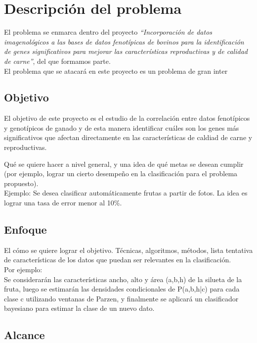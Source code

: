 \documentclass[12pt,a4paper,titlepage]{report}
\begin{document}
\chapter{Descripción del problema}

El problema se enmarca dentro del proyecto \emph{``Incorporación de datos imagenológicos a las bases de datos fenotípicas de bovinos para la identificación de genes significativos para mejorar las características reproductivas y de calidad de carne''}, del que formamos parte.\\

El problema que se atacará en este proyecto es un problema de gran inter

\section*{Objetivo}

El objetivo de este proyecto es el estudio de la correlación entre datos fenotípicos y genotípicos de ganado y de esta manera identificar cuáles son los genes más significativos que afectan directamente en las características de caldiad de carne y reproductivas. 

Qué se quiere hacer a nivel general, y una idea de qué metas se desean cumplir (por ejemplo, lograr un cierto desempeño en la clasificación para el problema propuesto).\\
Ejemplo: Se desea clasificar automáticamente frutas a partir de fotos. La idea es lograr una tasa de error menor al 10\%.

\section*{Enfoque}

El cómo se quiere lograr el objetivo. Técnicas, algoritmos, métodos, lista tentativa de características de los datos que puedan ser relevantes en la clasificación.\\
Por ejemplo:\\
    Se considerarán las características ancho, alto y área (a,b,h) de la silueta de la fruta, luego se estimarán las densidades condicionales de P(a,b,h|c) para cada clase c utilizando ventanas de Parzen, y finalmente se aplicará un clasificador bayesiano para estimar la clase de un nuevo dato.

\section*{Alcance}
\end{document}
